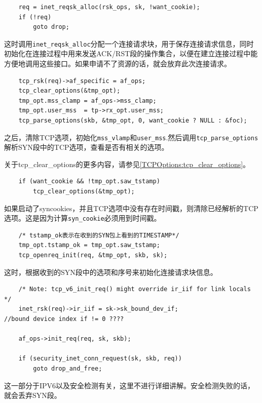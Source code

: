\begin{verbatim}
    req = inet_reqsk_alloc(rsk_ops, sk, !want_cookie);
    if (!req)
        goto drop;
\end{verbatim}
            
        这时调用\texttt{inet_reqsk_alloc}分配一个连接请求块，用于保存连接请求信息，同时初始化在连接过程中用来发送ACK/RST段的操作集合，以便在建立连接过程中能方便地调用这些接口。如果申请不了资源的话，就会放弃此次连接请求。

\begin{verbatim}
    tcp_rsk(req)->af_specific = af_ops;
    tcp_clear_options(&tmp_opt);
    tmp_opt.mss_clamp = af_ops->mss_clamp;
    tmp_opt.user_mss  = tp->rx_opt.user_mss;
    tcp_parse_options(skb, &tmp_opt, 0, want_cookie ? NULL : &foc);
\end{verbatim}

        之后，清除TCP选项，初始化\texttt{mss_vlamp}和\texttt{user_mss}.然后调用\texttt{tcp_parse_options}解析SYN段中的TCP选项，查看是否有相关的选项。

		关于tcp\_clear\_options的更多内容，请参见\ref{TCPOptions:tcp_clear_options}。
\begin{verbatim}
    if (want_cookie && !tmp_opt.saw_tstamp)
        tcp_clear_options(&tmp_opt);
\end{verbatim}

        如果启动了syncookies，并且TCP选项中没有存在时间戳，则清除已经解析的TCP选项。这是因为计算\texttt{syn_cookie}必须用到时间戳。

\begin{verbatim}
	/* tstamp_ok表示在收到的SYN包上看到的TIMESTAMP*/
    tmp_opt.tstamp_ok = tmp_opt.saw_tstamp;        
    tcp_openreq_init(req, &tmp_opt, skb, sk);
\end{verbatim}

        这时，根据收到的SYN段中的选项和序号来初始化连接请求块信息。

\begin{verbatim}
    /* Note: tcp_v6_init_req() might override ir_iif for link locals */
    inet_rsk(req)->ir_iif = sk->sk_bound_dev_if;                        //bound device index if != 0 ????

    af_ops->init_req(req, sk, skb);

    if (security_inet_conn_request(sk, skb, req))
        goto drop_and_free;
\end{verbatim}

        这一部分于IPV6以及安全检测有关，这里不进行详细讲解。安全检测失败的话，就会丢弃SYN段。

